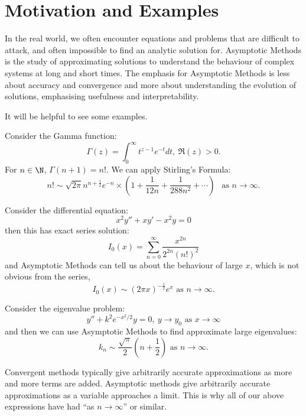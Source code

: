 \documentclass[../Main.tex]{subfiles}
\begin{document}
\section{Motivation and Examples}
In the real world, we often encounter equations and problems that are difficult to attack, and often impossible to find an analytic solution for. Asymptotic Methods is the study of approximating solutions to understand the behaviour of complex systems at long and short times. The emphasis for Asymptotic Methods is less about accuracy and convergence and more about understanding the evolution of solutions, emphasising usefulness and interpretability.

It will be helpful to see some examples.
\begin{example}
    Consider the Gamma function:
    \begin{equation*}
        \Gamma(z) = \int_{0}^{\infty} t^{z-1}e^{-t} dt,~\Re(z) > 0.
    \end{equation*}
    For $n \in \N$, $\Gamma(n+1) = n!$. We can apply Stirling's Formula:
    \begin{equation}
        n! \sim \sqrt{2\pi} n^{n+\frac12}e^{-n} \times \left(1 + \frac1{12n} + \frac1{288n^2} + \cdots\right) ~~ \text{ as $n \to \infty$.}
        \label{eqnFactorialApprox}
    \end{equation}
\end{example}
\begin{example}
    Consider the differential equation:
    \begin{equation*}
        x^2 y'' + xy' - x^2 y = 0
    \end{equation*}
    then this has exact series solution:
    \begin{equation*}
        I_0(x) = \sum_{n=0}^{\infty} \frac{x^{2n}}{2^{2n} (n!)^2}
    \end{equation*}
    and Asymptotic Methods can tell us about the behaviour of large $x$, which is not obvious from the series,
    \begin{equation*}
        I_0(x) \sim (2\pi x)^{-\frac12} e^x \text{ as $n \to \infty$.}
    \end{equation*}
\end{example}
\begin{example}
    Consider the eigenvalue problem:
    \begin{equation*}
        y'' + k^2 e^{-x^2 / 2}y = 0,~\text{$y \to y_0$ as $x \to\infty$}
    \end{equation*}
    and then we can use Asymptotic Methods to find approximate large eigenvalues:
    \begin{equation*}
        k_n \sim \frac{\sqrt{\pi}}{2} (n + \frac12) \text{ as $n \to \infty$.}
    \end{equation*}
\end{example}
\begin{remark}
    Convergent methods typically give arbitrarily accurate approximations as more and more terms are added. Asymptotic methods give arbitrarily accurate approximations as a variable approaches a limit. This is why all of our above expressions have had ``as $n \to \infty$'' or similar.
\end{remark}
\end{document}
